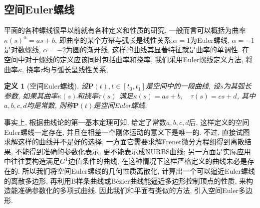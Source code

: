 \documentclass[utf8]{ctexart} %
\newtheorem{definition}{\indent 定义}[section]
\numberwithin{figure}{section}
\numberwithin{equation}{section}
\begin{document}
	 \subsection{空间Euler螺线}
	 平面的各种螺线很早以前就有各种定义和性质的研究, 一般而言可以概括为曲率$\kappa(s)^{\alpha} = as+b$, 即曲率的某个方幂与弧长是线性关系,$\alpha=1$为Euler螺线, $\alpha=-1$是对数螺线, $\alpha=-2$为圆的渐开线, 这样的曲线其显著特征就是曲率的单调性. 在空间中对于螺线的定义应该同时包括曲率和挠率, 我们采用Euler螺线定义方法, 将曲率$\kappa$, 挠率$\tau$均与弧长呈线性关系, 
	  \begin{definition}[空间Euler螺线]
	 	设$\boldsymbol{P}(t), t\in[t_0,t_1]$是空间中的一段曲线, 设$s$为其弧长参数, 如果其曲率$\kappa(s)$和挠率$\tau(s)$ 满足$\kappa(s) = as+b,\quad\tau(s) = cs+d$, 其中$a,b,c,d$均是常数, 则称$\boldsymbol{P}(t)$是空间Euler螺线.
	 \end{definition}
	 事实上, 根据曲线论的第一基本定理可知, 给定了常数$a,b,c,d$后, 这样定义的空间Euler螺线一定存在, 并且在相差一个刚体运动的意义下是唯一的. 不过, 直接试图求解这样的曲线并不是好的选择, 一方面它需要求解Frenet微分方程组得到离散结果, 不能得到准确的参数化表示, 更不能表示成NURBS曲线; 另一方面是实际应用中往往要构造满足$G^1$边值条件的曲线, 在这种情况下这样严格定义的曲线未必是存在的. 所以我们将空间Euler螺线的几何性质离散化, 计算出一个可以逼近Euler螺线的离散多边形, 再利用B样条曲线或B\'ezier曲线能逼近多边形控制顶点的性质, 来构造能准确参数化的多项式曲线. 因此我们和平面有类似的方法, 引入空间Euler多边形.
	
\end{document}
